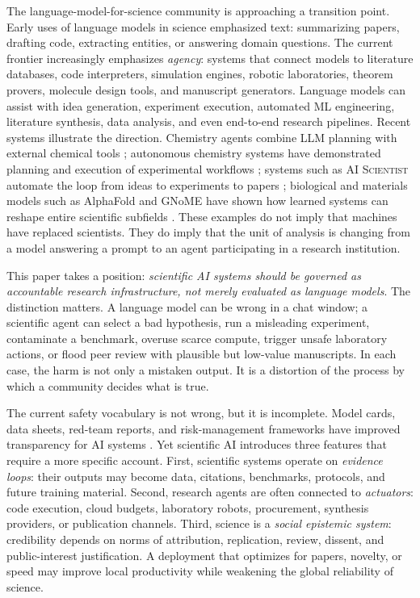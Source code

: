 \documentclass{article}
\begin{document}
The language-model-for-science community is approaching a transition point. Early uses of language models in science emphasized text: summarizing papers, drafting code, extracting entities, or answering domain questions. The current frontier increasingly emphasizes \emph{agency}: systems that connect models to literature databases, code interpreters, simulation engines, robotic laboratories, theorem provers, molecule design tools, and manuscript generators. Language models can assist with idea generation, experiment execution, automated ML engineering, literature synthesis, data analysis, and even end-to-end research pipelines. Recent systems illustrate the direction. Chemistry agents combine LLM planning with external chemical tools \citep{bran2023chemcrow}; autonomous chemistry systems have demonstrated planning and execution of experimental workflows \citep{boiko2023emergent}; systems such as \textsc{AI Scientist} automate the loop from ideas to experiments to papers \citep{lu2024aiscientist,yamada2025aiscientistv2}; biological and materials models such as AlphaFold and GNoME have shown how learned systems can reshape entire scientific subfields \citep{jumper2021alphafold,abramson2024alphafold3,merchant2023materials}. These examples do not imply that machines have replaced scientists. They do imply that the unit of analysis is changing from a model answering a prompt to an agent participating in a research institution.

This paper takes a position: \emph{scientific AI systems should be governed as accountable research infrastructure, not merely evaluated as language models}. The distinction matters. A language model can be wrong in a chat window; a scientific agent can select a bad hypothesis, run a misleading experiment, contaminate a benchmark, overuse scarce compute, trigger unsafe laboratory actions, or flood peer review with plausible but low-value manuscripts. In each case, the harm is not only a mistaken output. It is a distortion of the process by which a community decides what is true.

The current safety vocabulary is not wrong, but it is incomplete. Model cards, data sheets, red-team reports, and risk-management frameworks have improved transparency for AI systems \citep{mitchell2019modelcards,gebru2021datasheets,nist2023airmf}. Yet scientific AI introduces three features that require a more specific account. First, scientific systems operate on \emph{evidence loops}: their outputs may become data, citations, benchmarks, protocols, and future training material. Second, research agents are often connected to \emph{actuators}: code execution, cloud budgets, laboratory robots, procurement, synthesis providers, or publication channels. Third, science is a \emph{social epistemic system}: credibility depends on norms of attribution, replication, review, dissent, and public-interest justification. A deployment that optimizes for papers, novelty, or speed may improve local productivity while weakening the global reliability of science.
\end{document}
